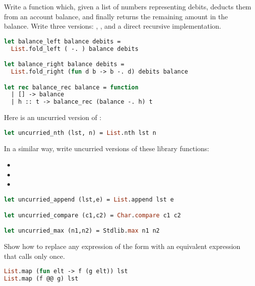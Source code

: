 Write a function which, given a list of numbers representing debits, deducts them from an account balance, and finally returns the remaining amount in the balance. Write three versions: , , and a direct recursive implementation.

\begin{lstlisting}[language=OCaml]
let balance_left balance debits = 
  List.fold_left ( -. ) balance debits

let balance_right balance debits = 
  List.fold_right (fun d b -> b -. d) debits balance

let rec balance_rec balance = function
  | [] -> balance
  | h :: t -> balance_rec (balance -. h) t
\end{lstlisting}

Here is an uncurried version of :
\begin{lstlisting}[language=OCaml]
let uncurried_nth (lst, n) = List.nth lst n
\end{lstlisting}
In a similar way, write uncurried versions of these library functions:
\begin{itemize}
  \item {}
  \item {}
  \item {}
\end{itemize}

\begin{lstlisting}[language=OCaml]
let uncurried_append (lst,e) = List.append lst e

let uncurried_compare (c1,c2) = Char.compare c1 c2

let uncurried_max (n1,n2) = Stdlib.max n1 n2
\end{lstlisting}

Show how to replace any expression of the form  with an equivalent expression that calls  only once.

\begin{lstlisting}[language=OCaml]
List.map (fun elt -> f (g elt)) lst
List.map (f @@ g) lst
\end{lstlisting}

